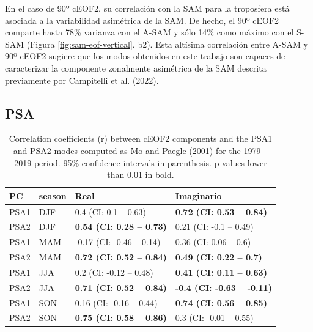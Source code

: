 \documentclass[12pt,oneside]{reedthesis}
\begin{document}
En el caso de 90º cEOF2, su correlación con la SAM para la troposfera está asociada a la variabilidad asimétrica de la SAM.
De hecho, el 90º cEOF2 comparte hasta 78\% varianza con el A-SAM y sólo 14\% como máximo con el S-SAM (Figura \ref{fig:sam-eof-vertical}.
b2).
Esta altísima correlación entre A-SAM y 90º cEOF2 sugiere que los modos obtenidos en este trabajo son capaces de caracterizar la componente zonalmente asimétrica de la SAM descrita previamente por Campitelli et al. (2022).

\hypertarget{psa}{%
\subsection{PSA}\label{psa}}



\begin{table}

\caption{\label{tab:psa-eof2}Correlation coefficients (r) between cEOF2 components and the PSA1 and PSA2 modes computed as Mo and Paegle (2001) for the 1979 -- 2019 period. 95\% confidence intervals in parenthesis. p-values lower than 0.01 in bold.}
\centering
\begin{tabular}[t]{ll>{}l>{}l}
\toprule
PC & season & Real & Imaginario\\
\midrule
PSA1 & DJF & 0.4 (CI: 0.1 -- 0.63) & \textbf{0.72 (CI: 0.53 -- 0.84)}\\
PSA2 & DJF & \textbf{0.54 (CI: 0.28 -- 0.73)} & 0.21 (CI: -0.1 -- 0.49)\\
PSA1 & MAM & -0.17 (CI: -0.46 -- 0.14) & 0.36 (CI: 0.06 -- 0.6)\\
PSA2 & MAM & \textbf{0.72 (CI: 0.52 -- 0.84)} & \textbf{0.49 (CI: 0.22 -- 0.7)}\\
PSA1 & JJA & 0.2 (CI: -0.12 -- 0.48) & \textbf{0.41 (CI: 0.11 -- 0.63)}\\
\addlinespace
PSA2 & JJA & \textbf{0.71 (CI: 0.52 -- 0.84)} & \textbf{-0.4 (CI: -0.63 -- -0.11)}\\
PSA1 & SON & 0.16 (CI: -0.16 -- 0.44) & \textbf{0.74 (CI: 0.56 -- 0.85)}\\
PSA2 & SON & \textbf{0.75 (CI: 0.58 -- 0.86)} & 0.3 (CI: -0.01 -- 0.55)\\
\bottomrule
\end{tabular}
\end{table}
\end{document}
